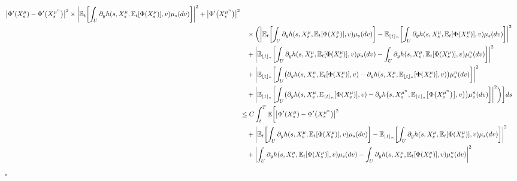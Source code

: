 \documentclass[12pt]{article}
\DeclarePairedDelimiter\floor{\lfloor}{\rfloor}
\theoremstyle{named}
\numberwithin{equation}{section}
\newenvironment{Proof}{\removelastskip\par\medskip \noindent{\em Proof.} \rm}{\penalty-20\null\hfill$\square$\par\medbreak}
\begin{document}
\begin{Proof}
\begin{align}
    \big| \Phi'(X^{{\mu}}_s) - \Phi'\big(X^{{\mu}^n }_s\big) \big|^2 \times \biggl|\mathbb{E}_t \biggl[
        \int_U \partial_yh(s, X^{{\mu}}_s, \mathbb{E}_t [\Phi(X^{{\mu}}_s)], v) {\mu}_s(dv)
        \biggr]\biggr|^2  +\big| \Phi'\big(X^{{\mu}^n }_s\big) \big|^2
    \nonumber\\
    &\quad\times \biggl( \biggl| \mathbb{E}_t \biggl[ \int_U \partial_yh(s, X^{{\mu}}_s, \mathbb{E}_t [\Phi(X^{{\mu}}_s)], v) {\mu}_s(dv)\biggr]
     - \mathbb{E}_{\floor{t}_{n}} \biggl[
        \int_U \partial_yh(s, X^{{\mu}}_s, \mathbb{E}_t [\Phi(X^{{\mu}}_s)], v) {\mu}_s(dv)\biggr]
      \biggr|^2 \nonumber\\
      &\quad
      + \biggl|
      \mathbb{E}_{\floor{t}_{n}} \biggl[ \int_U \partial_yh(s, X^{{\mu}}_s, \mathbb{E}_t [\Phi(X^{{\mu}}_s)], v) {\mu}_s(dv) - \int_U \partial_yh(s, X^{{\mu}}_s, \mathbb{E}_t [\Phi(X^{{\mu}}_s)], v) {\mu}^n _s(dv)\biggr] \biggr|^2         \nonumber\\
        &\quad
        + \biggl| \mathbb{E}_{\floor{t}_{n}} \biggl[ \int_U \bigl( \partial_yh(s, X^{{\mu}}_s, \mathbb{E}_t [\Phi(X^{{\mu}}_s)], v) - \partial_yh(s, X^{{\mu}}_s, \mathbb{E}_{\floor{t}_{n}} [\Phi(X^{{\mu}}_s)], v)  \bigr) {\mu}^n _s(dv)\biggr]  \biggr|^2
        \nonumber\\
        &\quad
        +\biggl| \mathbb{E}_{\floor{t}_{n}} \biggl[ \int_U \bigl( \partial_yh(s, X^{{\mu}}_s, \mathbb{E}_{\floor{t}_{n}} [\Phi(X^{{\mu}}_s)], v) - \partial_yh\big(s, X^{{\mu}^n }_s, \mathbb{E}_{\floor{t}_{n}} \big[\Phi\big(X^{{\mu}^n }_s\big)\big], v\big)  \bigr) {\mu}^n _s(dv)\biggr] \biggr|^2
        \biggr) \biggr] ds
  \nonumber\\
&\leq C \int_t^T \mathbb{E} \biggl[
    \big| \Phi'(X^{{\mu}}_s) - \Phi'\big(X^{{\mu}^n }_s\big) \big|^2
          \label{p q L2 convergence proof third inequality1}
          \\
    &\quad+  \biggl| \mathbb{E}_t \biggl[ \int_U \partial_yh(s, X^{{\mu}}_s, \mathbb{E}_t [\Phi(X^{{\mu}}_s)], v) {\mu}_s(dv)\biggr]
     - \mathbb{E}_{\floor{t}_{n}} \biggl[
        \int_U \partial_yh(s, X^{{\mu}}_s, \mathbb{E}_t [\Phi(X^{{\mu}}_s)], v) {\mu}_s(dv)\biggr]
     \biggr|^2
     \label{p q L2 convergence proof third inequality2}
     \\
      &\quad
      + \biggl|
      \int_U \partial_yh(s, X^{{\mu}}_s, \mathbb{E}_t [\Phi(X^{{\mu}}_s)], v) {\mu}_s(dv) - \int_U \partial_yh(s, X^{{\mu}}_s, \mathbb{E}_t [\Phi(X^{{\mu}}_s)], v) {\mu}^n _s(dv) \biggr|^2
      \label{p q L2 convergence proof third inequality3}

\end{align}
\end{Proof}
\end{document}
